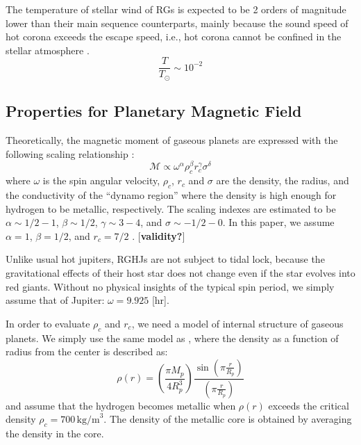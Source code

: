 \documentclass{emulateapj}
\def\memo#1{\color{red}$[${\bf #1}$]$ \color{black}}
\begin{document}
The temperature of stellar wind of RGs is expected to be 2 orders of magnitude lower than their main sequence counterparts, mainly because the sound speed of hot corona exceeds the escape speed, i.e., hot corona cannot be confined in the stellar atmosphere \citep{suzuki2008}. 
\begin{equation}
\frac{T}{T_{\odot}} \sim 10^{-2}
\end{equation}


\subsection{Properties for Planetary Magnetic Field}

Theoretically, the magnetic moment of gaseous planets are expressed with the following scaling relationship \citep{griebmeier2004}:
\begin{equation}
\mathcal{M} \propto  \omega ^{\alpha } \rho_c ^{\beta } r_c^{\gamma } \sigma ^{\delta }
\end{equation}
where $\omega $ is the spin angular velocity, $\rho _c$, $r_c$ and $\sigma $ are the density, the radius, and the conductivity of the ``dynamo region'' where the density is high enough for hydrogen to be metallic, respectively. 
The scaling indexes are estimated to be $\alpha \sim 1/2-1$, $\beta \sim 1/2$, $\gamma \sim 3-4$, and $\sigma \sim -1/2-0$. In this paper, we assume $\alpha =1$, $\beta =1/2$, and $r_c = 7/2$ \citep{sano1993}. \memo{validity?}

Unlike usual hot jupiters, RGHJs are not subject to tidal lock, because the gravitational effects of their host star does not change even if the star evolves into red giants. Without no physical insights of the typical spin period, we simply assume that of Jupiter: $\omega = 9.925$ [hr]. 

In order to evaluate $\rho _c $ and $r_c$, we need a model of internal structure of gaseous planets. We simply use the same model as \citet{griebmeier2004}, where the density as a function of radius from the center is described as:
\begin{equation}
\rho (r) = \left( \frac{\pi M_p}{4 R_p^3} \right) \frac{\sin \left( \pi \frac{r}{R_p} \right)}{\left( \pi \frac{r}{R_p} \right)} \label{eq:rho_r}
\end{equation}
and assume that the hydrogen becomes metallic when $\rho (r)$ exceeds the critical density $\rho_c=700\,\mbox{kg/m}^3$. The density of the metallic core is obtained by averaging the density in the core. 
\end{document}
